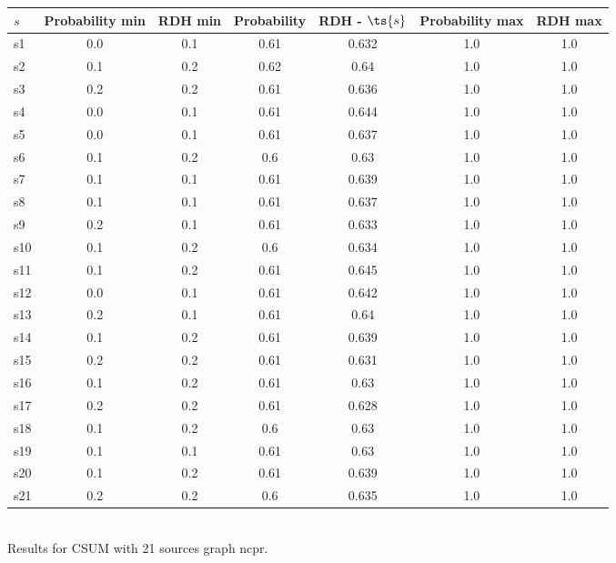 \documentclass{article}
\begin{document}
\noindent\begin{tabular}{|l|c|c|c|c|c|c|}
\hline
$s$& Probability min & RDH min & Probability & RDH - $\ts{s}$ & Probability max & RDH max\\
\hline
s1 &0.0 & 0.1 & 0.61 & 0.632 & 1.0 & 1.0\\
\hline
s2 &0.1 & 0.2 & 0.62 & 0.64 & 1.0 & 1.0\\
\hline
s3 &0.2 & 0.2 & 0.61 & 0.636 & 1.0 & 1.0\\
\hline
s4 &0.0 & 0.1 & 0.61 & 0.644 & 1.0 & 1.0\\
\hline
s5 &0.0 & 0.1 & 0.61 & 0.637 & 1.0 & 1.0\\
\hline
s6 &0.1 & 0.2 & 0.6 & 0.63 & 1.0 & 1.0\\
\hline
s7 &0.1 & 0.1 & 0.61 & 0.639 & 1.0 & 1.0\\
\hline
s8 &0.1 & 0.1 & 0.61 & 0.637 & 1.0 & 1.0\\
\hline
s9 &0.2 & 0.1 & 0.61 & 0.633 & 1.0 & 1.0\\
\hline
s10 &0.1 & 0.2 & 0.6 & 0.634 & 1.0 & 1.0\\
\hline
s11 &0.1 & 0.2 & 0.61 & 0.645 & 1.0 & 1.0\\
\hline
s12 &0.0 & 0.1 & 0.61 & 0.642 & 1.0 & 1.0\\
\hline
s13 &0.2 & 0.1 & 0.61 & 0.64 & 1.0 & 1.0\\
\hline
s14 &0.1 & 0.2 & 0.61 & 0.639 & 1.0 & 1.0\\
\hline
s15 &0.2 & 0.2 & 0.61 & 0.631 & 1.0 & 1.0\\
\hline
s16 &0.1 & 0.2 & 0.61 & 0.63 & 1.0 & 1.0\\
\hline
s17 &0.2 & 0.2 & 0.61 & 0.628 & 1.0 & 1.0\\
\hline
s18 &0.1 & 0.2 & 0.6 & 0.63 & 1.0 & 1.0\\
\hline
s19 &0.1 & 0.1 & 0.61 & 0.63 & 1.0 & 1.0\\
\hline
s20 &0.1 & 0.2 & 0.61 & 0.639 & 1.0 & 1.0\\
\hline
s21 &0.2 & 0.2 & 0.6 & 0.635 & 1.0 & 1.0\\
\hline
\end{tabular}\\

\noindent Results for CSUM with 21 sources graph ncpr.
\end{document}
